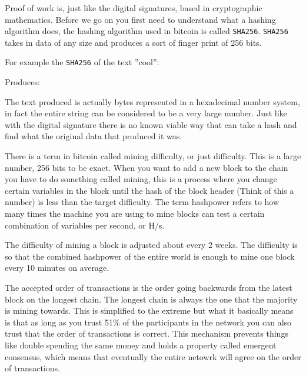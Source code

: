 Proof of work is, just like the digital signatures, based in cryptographic mathematics. Before we go on you first need to understand what a hashing algorithm does, the hashing algorithm used in bitcoin is called \texttt{SHA256}. \texttt{SHA256} takes in data of any size and produces a sort of finger print of 256 bits. 

For example the \texttt{SHA256} of the text ''cool'': 


Produces: 


The text produced is actually bytes represented in a hexadecimal number system, in fact the entire string can be considered to be a very large number. Just like with the digital signature there is no known viable way that can take a hash and find what the original data that produced it was. 

There is a term in bitcoin called mining difficulty, or just difficulty. This is a large number, 256 bits to be exact. When you want to add a new block to the chain you have to do something called mining, this is a process where you change certain variables in the block until the hash of the block header (Think of this a number) is less than the target difficulty. The term hashpower refers to how many times the machine you are using to mine blocks can test a certain combination of variables per second, or H/s.

The difficulty of mining a block is adjusted about every 2 weeks. The difficulty is so that the combined hashpower of the entire world is enough to mine one block every 10 minutes on average. 

The accepted order of transactions is the order going backwards from the latest block on the longest chain. The longest chain is always the one that the majority is mining towards. This is simplified to the extreme but what it basically means is that as long as you trust 51\% of the participants in the network you can also trust that the order of transactions is correct. This mechanism prevents things like double spending the same money and holds a property called emergent consensus, which means that eventually the entire netowrk will agree on the order of transactions.

